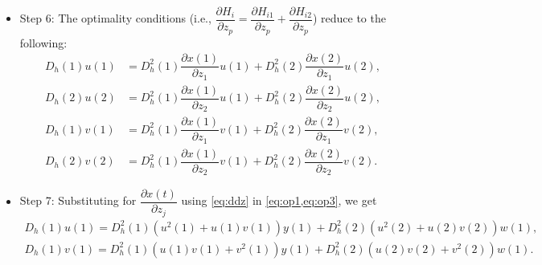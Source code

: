 \documentclass{article}
\begin{document}
\begin{itemize}[leftmargin=10pt]
    \item Step 6: The optimality conditions (i.e., $\dfrac{\partial H_i}{\partial z_p} = \dfrac{\partial H_{i1}}{\partial z_p} +  \dfrac{\partial H_{i2}}{\partial z_p}$) reduce to the following:
    \begin{align}
        D_h(1) u(1) &= D_h^2(1) \dfrac{\partial x(1)}{\partial z_1} u(1) + D_h^2(2) \dfrac{\partial x(2)}{\partial z_1} u(2),  \label{eq:op1}\\
        D_h(2) u(2) &= D_h^2(1) \dfrac{\partial x(1)}{\partial z_2} u(1) + D_h^2(2) \dfrac{\partial x(2)}{\partial z_2} u(2), \label{eq:op2} \\
        D_h(1) v(1) &= D_h^2(1) \dfrac{\partial x(1)}{\partial z_1} v(1) + D_h^2(2) \dfrac{\partial x(2)}{\partial z_1} v(2), \label{eq:op3} \\
        D_h(2) v(2) &= D_h^2(1) \dfrac{\partial x(1)}{\partial z_2} v(1) + D_h^2(2) \dfrac{\partial x(2)}{\partial z_2} v(2). \label{eq:op4}
    \end{align}
    
    \item Step 7: Substituting for $\dfrac{\partial x(t)}{\partial z_j}$ using \cref{eq:ddz} in \cref{eq:op1,eq:op3}, we get
    \begin{align}
        D_h(1) u(1) = D_h^2(1) \left( u^2(1) + u(1)v(1) \right) y(1) + D_h^2(2) \left( u^2(2) + u(2)v(2) \right) w(1), \label{eq:op11} \\ 
        D_h(1) v(1) = D_h^2(1) \left( u(1)v(1) + v^2(1) \right) y(1) + D_h^2(2) \left( u(2) v(2) + v^2(2) \right) w(1). \label{eq:op33}
    \end{align}
    
\end{itemize}
\end{document}
